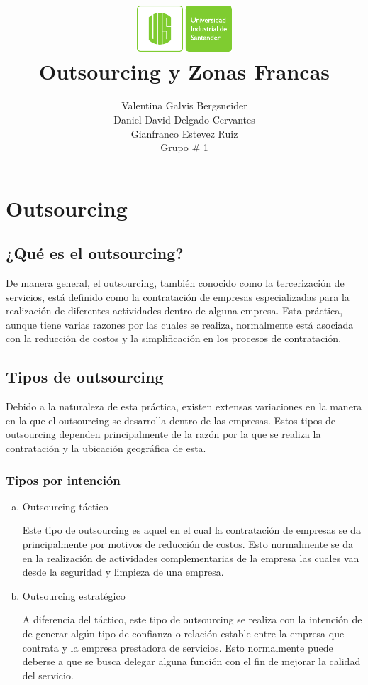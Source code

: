 \documentclass[10pt]{article}
\title{
    \includegraphics[width=0.3 \linewidth]{Logos/UIS.pdf} \\
    Outsourcing y Zonas Francas}
\author{Valentina Galvis Bergsneider \\ 
    Daniel David Delgado Cervantes \\ 
    Gianfranco Estevez Ruiz \\ 
    Grupo \# 1
}
\begin{document}
    \maketitle

\section{Outsourcing}

    \subsection{¿Qué es el outsourcing?}
        De manera general, el outsourcing, también conocido como la tercerización de servicios, está definido como la contratación de empresas especializadas para la realización de diferentes actividades dentro de alguna empresa. Esta práctica, aunque tiene varias razones por las cuales se realiza, normalmente está asociada con la reducción de costos y la simplificación en los procesos de contratación. 
        \cite{ref:investopediaOut} 

    \subsection{Tipos de outsourcing}
        Debido a la naturaleza de esta práctica, existen extensas variaciones en la manera en la que el outsourcing se desarrolla dentro de las empresas. Estos tipos de outsourcing dependen principalmente de la razón por la que se realiza la contratación y la ubicación geográfica de esta. 
        \cite{ref:Externalia}

        \subsubsection{Tipos por intención}
        
        \begin{enumerate}[a)]
            \item Outsourcing táctico

            Este tipo de outsourcing es aquel en el cual la contratación de empresas se da principalmente por motivos de reducción de costos. Esto normalmente se da en la realización de actividades complementarias de la empresa las cuales van desde la seguridad y limpieza de una empresa.
            
            \item Outsourcing estratégico
            
            A diferencia del táctico, este tipo de outsourcing se realiza con la intención de de generar algún tipo de confianza o relación estable entre la empresa que contrata y la empresa prestadora de servicios. Esto normalmente puede deberse a que se busca delegar alguna función con el fin de mejorar la calidad del servicio. 

        \end{enumerate}
    
\end{document}
